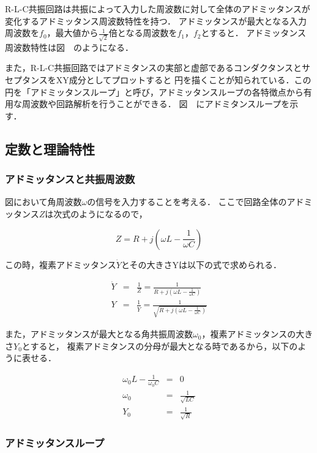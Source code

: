 \documentclass[dvipdfmx,titlepage,a4j]{jsarticle}  %
\numberwithin{equation}{section}
\begin{document}
R-L-C共振回路は共振によって入力した周波数に対して全体のアドミッタンスが変化するアドミッタンス周波数特性を持つ．
アドミッタンスが最大となる入力周波数を$f_0$，最大値から$\frac{1}{\sqrt{2}}$倍となる周波数を$f_1$，$f_2$とすると．
アドミッタンス周波数特性は図　のようになる．

また，R-L-C共振回路ではアドミタンスの実部と虚部であるコンダクタンスとサセプタンスをXY成分としてプロットすると
円を描くことが知られている．この円を「アドミッタンスループ」と呼び，アドミッタンスループの各特徴点から有用な周波数や回路解析を行うことができる．
図　にアドミタンスループを示す．

\subsection{定数と理論特性}
\subsubsection{アドミッタンスと共振周波数}
図において角周波数$\omega$の信号を入力することを考える．
ここで回路全体のアドミッタンス$Z$は次式のようになるので，

\begin{equation}
  Z = R + j(\omega L - \frac{1}{\omega C})
\end{equation}

この時，複素アドミッタンス$\dot{Y}$とその大きさYは以下の式で求められる．

\begin{eqnarray}
  \dot{Y} &=& \frac{1}{Z} = \frac{1}{R + j(\omega L - \frac{1}{\omega C})} \\
  Y &=& \frac{1}{\dot{Y}} = \frac{1}{\sqrt{R + j(\omega L - \frac{1}{\omega C})}}
\end{eqnarray}

また，アドミッタンスが最大となる角共振周波数$\omega_0$，複素アドミッタンスの大きさ$Y_0$とすると，
複素アドミタンスの分母が最大となる時であるから，以下のように表せる．

\begin{eqnarray}
  \omega_0 L - \frac{1}{\omega_0 C} &=& 0 \\
  \omega_0 &=& \frac{1}{\sqrt{LC}} \\
  Y_0 &=& \frac{1}{\sqrt{R}}
\end{eqnarray}

\subsubsection{アドミッタンスループ}
\end{document}
